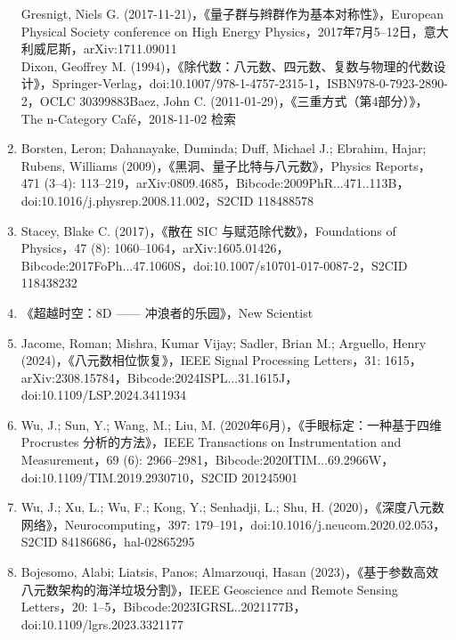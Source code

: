\begin{enumerate}
Gresnigt, Niels G. (2017-11-21)，《量子群与辫群作为基本对称性》，European Physical Society conference on High Energy Physics，2017年7月5–12日，意大利威尼斯，arXiv:1711.09011\\
Dixon, Geoffrey M. (1994)，《除代数：八元数、四元数、复数与物理的代数设计》，Springer-Verlag，doi:10.1007/978-1-4757-2315-1，ISBN978-0-7923-2890-2，OCLC 30399883Baez, John C. (2011-01-29)，《三重方式（第4部分）》，The n-Category Café，2018-11-02 检索
\item Borsten, Leron; Dahanayake, Duminda; Duff, Michael J.; Ebrahim, Hajar; Rubens, Williams (2009)，《黑洞、量子比特与八元数》，Physics Reports，471 (3–4): 113–219，arXiv:0809.4685，Bibcode:2009PhR...471..113B，doi:10.1016/j.physrep.2008.11.002，S2CID 118488578
\item Stacey, Blake C. (2017)，《散在 SIC 与赋范除代数》，Foundations of Physics，47 (8): 1060–1064，arXiv:1605.01426，Bibcode:2017FoPh...47.1060S，doi:10.1007/s10701-017-0087-2，S2CID 118438232
\item 《超越时空：8D —— 冲浪者的乐园》，New Scientist
\item Jacome, Roman; Mishra, Kumar Vijay; Sadler, Brian M.; Arguello, Henry (2024)，《八元数相位恢复》，IEEE Signal Processing Letters，31: 1615，arXiv:2308.15784，Bibcode:2024ISPL...31.1615J，doi:10.1109/LSP.2024.3411934
\item Wu, J.; Sun, Y.; Wang, M.; Liu, M. (2020年6月)，《手眼标定：一种基于四维 Procrustes 分析的方法》，IEEE Transactions on Instrumentation and Measurement，69 (6): 2966–2981，Bibcode:2020ITIM...69.2966W，doi:10.1109/TIM.2019.2930710，S2CID 201245901
\item Wu, J.; Xu, L.; Wu, F.; Kong, Y.; Senhadji, L.; Shu, H. (2020)，《深度八元数网络》，Neurocomputing，397: 179–191，doi:10.1016/j.neucom.2020.02.053，S2CID 84186686，hal-02865295
\item Bojesomo, Alabi; Liatsis, Panos; Almarzouqi, Hasan (2023)，《基于参数高效八元数架构的海洋垃圾分割》，IEEE Geoscience and Remote Sensing Letters，20: 1–5，Bibcode:2023IGRSL..2021177B，doi:10.1109/lgrs.2023.3321177
\end{enumerate}